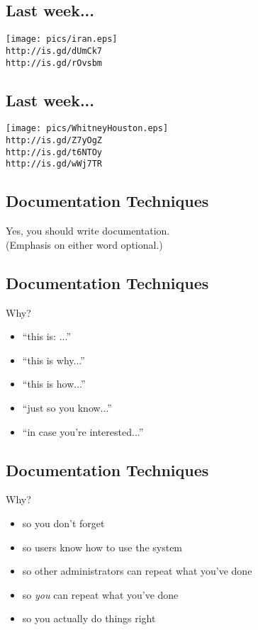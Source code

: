 \documentclass[xga]{xdvislides}
\begin{document}
\subsection{Last week...}
\begin{center}
	\texttt{[image: pics/iran.eps]} \\
	{\tt http://is.gd/dUmCk7} \\
	{\tt http://is.gd/rOvsbm}
\end{center}

\subsection{Last week...}
\begin{center}
	\texttt{[image: pics/WhitneyHouston.eps]} \\
	{\tt http://is.gd/Z7yOgZ} \\
	{\tt http://is.gd/t6NTOy} \\
	{\tt http://is.gd/wWj7TR}
\end{center}

\subsection{Documentation Techniques}
\vfill
\begin{center}
\Huge
Yes, you should write documentation. \\
\small
(Emphasis on either word optional.)
\Normalsize
\end{center}
\vfill

\subsection{Documentation Techniques}
Why?
\begin{itemize}
	\item ``this is: ...''
	\item ``this is why...''
	\item ``this is how...''
	\item ``just so you know...''
	\item ``in case you're interested...''
\end{itemize}

\subsection{Documentation Techniques}
Why?
\begin{itemize}
	\item so you don't forget
	\item so users know how to use the system
	\item so other administrators can repeat what you've done
	\item so {\em you} can repeat what you've done
	\item so you actually do things right
\end{itemize}
\end{document}

